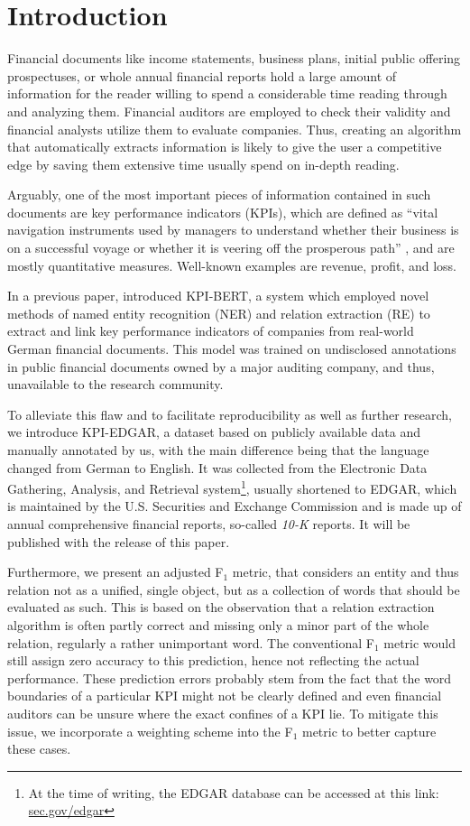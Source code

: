 \documentclass[conference, table]{IEEEtran}
\newcommand{\1} {\mathbbm{1}}
\begin{document}
\section{Introduction}
Financial documents like income statements, business plans, initial public offering prospectuses, or whole annual financial reports hold a large amount of information for the reader willing to spend a considerable time reading through and analyzing them. Financial auditors are employed to check their validity and financial analysts utilize them to evaluate companies. Thus, creating an algorithm that automatically extracts information is likely to give the user a competitive edge by saving them extensive time usually spend on in-depth reading. 

Arguably, one of the most important pieces of information contained in such documents are key performance indicators (KPIs), which are defined as ``vital navigation instruments used by managers to
understand whether their business is on a successful voyage or whether it is veering off the
prosperous path'' \cite{marr2012key}, and are mostly quantitative measures. Well-known examples are revenue, profit, and loss.

In a previous paper, \cite{kpi-bert} introduced KPI-BERT, a system which employed novel methods of named entity recognition (NER) and relation extraction (RE) to extract and link key performance indicators of companies from real-world German financial documents. This model was trained on undisclosed annotations in public financial documents owned by a major auditing company, and thus, unavailable to the research community.

To alleviate this flaw and to facilitate reproducibility as well as further research, we introduce KPI-EDGAR, a dataset based on publicly available data and manually annotated by us, with the main difference being that the language changed from German to English. It was collected from the Electronic Data Gathering, Analysis, and Retrieval system\footnote{At the time of writing, the EDGAR database can be accessed at this link:
\href{https://www.sec.gov/edgar.shtml}{sec.gov/edgar}}, usually shortened to EDGAR, which is maintained by the U.S. Securities and Exchange Commission and is made up of annual comprehensive financial reports, so-called \textit{10-K} reports.  It will be published with the release of this paper.

Furthermore, we present an adjusted F$_1$ metric, that considers an entity and thus relation not as a unified, single object, but as a collection of words that should be evaluated as such. This is based on the observation that a relation extraction algorithm is often partly correct and missing only a minor part of the whole relation, regularly a rather unimportant word. The conventional F$_1$ metric would still assign zero accuracy to this prediction, hence not reflecting the actual performance. These prediction errors probably stem from the fact that the word boundaries of a particular KPI might not be clearly defined and even financial auditors can be unsure where the exact confines of a KPI lie. To mitigate this issue, we incorporate a weighting scheme into the F$_1$ metric to better capture these cases.
\end{document}
